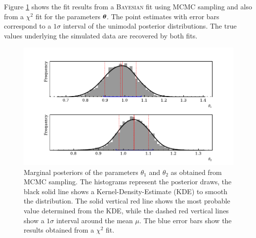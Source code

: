 Figure \ref{fig:kde} shows the fit results from a \textsc{Bayesian} fit using MCMC sampling and also from a $\chi^2$ fit for the parameters $\boldsymbol{\theta}$. The point estimates with error bars correspond to a $1\sigma$ interval of the unimodal posterior distributions. The true values underlying the simulated data are recovered by both fits.
\begin{figure}[htbp]
	\centering
	\includegraphics[width=\linewidth]{../bayes/noisy_model/posterior_2_params.pdf}
	\caption{Marginal posteriors of the parameters $\theta_1$ and $\theta_2$ as obtained from MCMC sampling. The histograms represent the posterior draws, the black solid line shows a Kernel-Density-Estimate (KDE) to smooth the distribution. The solid vertical red line shows the most probable value determined from the KDE, while the dashed red vertical lines show a $1\sigma$ interval around the mean $\mu$. The blue error bars show the results obtained from a $\chi^2$ fit.}
	\label{fig:kde}
\end{figure}

